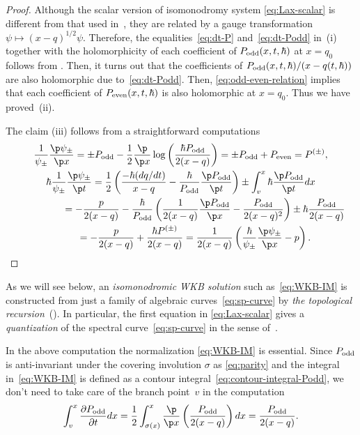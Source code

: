 \begin{proof}
Although the scalar version of isomonodromy system \eqref{eq:Lax-scalar}
is dif\/ferent from that used in~\cite{KT-PI}, they are
related by a gauge transformation $\psi \mapsto (x-q)^{1/2} \psi$.
Therefore, the equalities~\eqref{eq:dt-P} and~\eqref{eq:dt-Podd}
in~(i) together with the holomorphicity of each coef\/f\/icient
of $P_{\rm odd}(x,t,\hbar)$ at $x=q_{0}$ follows from
\cite[Proposition~1.2 and Theorem~1.1]{KT-PI}.
Then, it turns out that the coef\/f\/icients of
$P_{\rm odd}(x,t,\hbar)/(x-q(t,\hbar))$
are also holomorphic due to~\eqref{eq:dt-Podd}.
Then, \eqref{eq:odd-even-relation}
implies that each coef\/f\/icient of $P_{\rm even}(x,t,\hbar)$ is also
holomorphic at $x=q_{0}$.
Thus we have proved~(ii).

The claim (iii) follows from a straightforward computations
\begin{gather*}
\frac{1}{\psi_{\pm}} \frac{\p \psi_{\pm}}{\p x}  =
\pm P_{\rm odd} -\frac{1}{2}\frac{\p}{\p x} \log
\left(\frac{ \hbar P_{\rm odd}}{2(x-q)}\right)
= \pm P_{\rm odd} + P_{\rm even}
= P^{(\pm)}, \\
\hbar\frac{1}{\psi_{\pm}} \frac{\p \psi_{\pm}}{\p t}   =
\frac{1}{2}\left( \frac{-\hbar (dq/dt)}{x-q} - \frac{\hbar}{P_{\rm odd}}
\frac{\p P_{\rm odd}}{\p t} \right) \pm \int^{x}_{v}
\hbar\frac{\p P_{\rm odd}}{\p t} dx \\
\hphantom{\hbar\frac{1}{\psi_{\pm}} \frac{\p \psi_{\pm}}{\p t}  }{}
  =
-\frac{p}{2(x-q)} - \frac{\hbar}{P_{\rm odd}}
\left( \frac{1}{2(x-q)}\frac{\p P_{\rm odd}}{\p x} -
\frac{P_{\rm odd}}{2(x-q)^{2}} \right) \pm \hbar \frac{P_{\rm odd}}{2(x-q)} \\
\hphantom{\hbar\frac{1}{\psi_{\pm}} \frac{\p \psi_{\pm}}{\p t}  }{} =
-\frac{p}{2(x-q)} + \frac{\hbar P^{(\pm)}}{2(x-q)} =
\frac{1}{2(x-q)} \left( \frac{\hbar}{\psi_{\pm}}
\frac{\p \psi_{\pm}}{\p x} - p \right).\tag*{\qed}
\end{gather*}
\renewcommand{\qed}{}
\end{proof}

As we will see below, an {\em isomonodromic WKB solution}
such as~\eqref{eq:WKB-IM}
is constructed from just a family of algebraic curves~\eqref{eq:sp-curve}
by {\em the topological recursion}~(\cite{EO07}).
In particular, the f\/irst equation
in \eqref{eq:Lax-scalar} gives a {\em quantization}
of the spectral curve~\eqref{eq:sp-curve}
in the sense of~\cite{DM14, DM14-2}.

\begin{rem}
In the above computation the normalization \eqref{eq:WKB-IM}
is essential. Since $P_{\rm odd}$ is anti-invariant under the
covering involution $\sigma$ as \eqref{eq:parity} and
the integral in~\eqref{eq:WKB-IM} is
def\/ined as a contour integral~\eqref{eq:contour-integral-Podd},
we don't need to take care of the branch point~$v$ in the computation
\begin{gather*}
\int^{x}_{v} \frac{\partial P_{\rm odd}}{\partial t}dx =
\frac{1}{2}\int^{x}_{\sigma(x)}
\frac{\p}{\p x}\left( \frac{P_{\rm odd}}{2(x-q)}\right)dx
= \frac{P_{\rm odd}}{2(x-q)}.
\end{gather*}
\end{rem}

